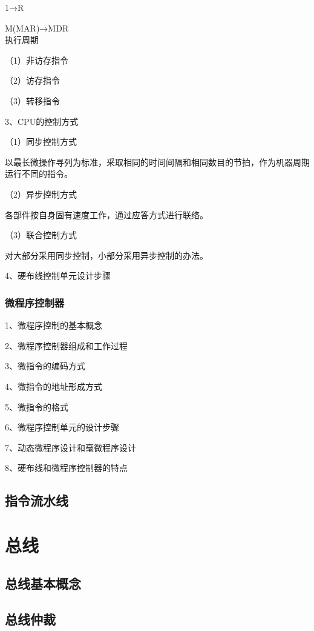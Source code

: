 \documentclass{ctexart}
\begin{document}
1→R

M(MAR)→MDR
\\

执行周期

（1）非访存指令

（2）访存指令

（3）转移指令

3、CPU的控制方式

（1）同步控制方式

以最长微操作寻列为标准，采取相同的时间间隔和相同数目的节拍，作为机器周期运行不同的指令。

（2）异步控制方式

各部件按自身固有速度工作，通过应答方式进行联络。

（3）联合控制方式

对大部分采用同步控制，小部分采用异步控制的办法。

4、硬布线控制单元设计步骤

\subsubsection{微程序控制器}

1、微程序控制的基本概念

2、微程序控制器组成和工作过程

3、微指令的编码方式

4、微指令的地址形成方式

5、微指令的格式

6、微程序控制单元的设计步骤

7、动态微程序设计和毫微程序设计

8、硬布线和微程序控制器的特点


\subsection{指令流水线}










\section{总线}

\subsection{总线基本概念}

\subsection{总线仲裁}
\end{document}

